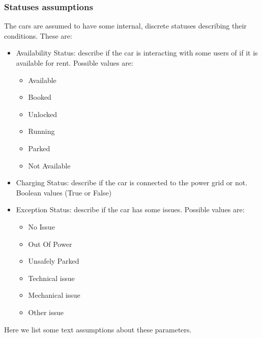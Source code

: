 \documentclass[11pt]{article} %
\begin{document}
\subsubsection{Statuses assumptions}
The cars are assumed to have some internal, discrete statuses describing their conditions. These are:
\begin{itemize}
	\item{Availability Status}: describe if the car is interacting with some users of if it is available for rent. Possible values are:
		\begin{itemize}
		\item Available
		\item Booked
		\item Unlocked
		\item Running
		\item Parked
		\item Not Available
		\end{itemize}	
	\item{Charging Status}: describe if the car is connected to the power grid or not. Boolean values (True or False)
	\item{Exception Status}: describe if the car has some issues. Possible values are:
		\begin{itemize}
		\item No Issue
		\item Out Of Power
		\item Unsafely Parked
		\item Technical issue
		\item Mechanical issue
		\item Other issue
		\end{itemize}
\end{itemize}
Here we list some text assumptions about these parameters.
\end{document}
